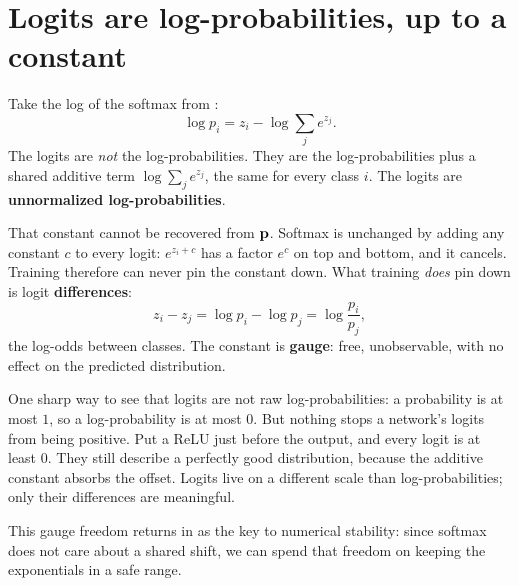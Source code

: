 
\section{Logits are log-probabilities, up to a constant}\label{sec:logits-logprobs}

Take the log of the softmax from :
\[
  \log p_i = z_i - \log \sum_j e^{z_j}.
\]
The logits are \emph{not} the log-probabilities. They are the
log-probabilities plus a shared additive term $\log \sum_j e^{z_j}$,
the same for every class $i$. The logits are \textbf{unnormalized
log-probabilities}.

That constant cannot be recovered from $\mathbf{p}$. Softmax is unchanged by
adding any constant $c$ to every logit: $e^{z_i + c}$ has a factor
$e^c$ on top and bottom, and it cancels. Training therefore can never
pin the constant down. What training \emph{does} pin down is logit
\textbf{differences}:
\begin{equation}\label{eq:logodds}
  z_i - z_j = \log p_i - \log p_j = \log \frac{p_i}{p_j},
\end{equation}
the log-odds between classes. The constant is \textbf{gauge}: free,
unobservable, with no effect on the predicted distribution.

One sharp way to see that logits are not raw log-probabilities: a
probability is at most $1$, so a log-probability is at most $0$. But
nothing stops a network's logits from being positive. Put a ReLU just
before the output, and every logit is at least $0$. They still describe
a perfectly good distribution, because the additive constant absorbs
the offset. Logits live on a different scale than log-probabilities;
only their differences are meaningful.

This gauge freedom returns in  as the key to
numerical stability: since softmax does not care about a shared shift,
we can spend that freedom on keeping the exponentials in a safe range.
